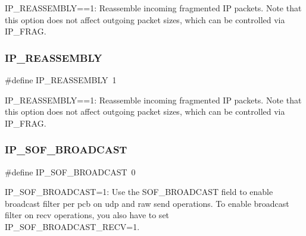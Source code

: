 I\+P\+\_\+\+R\+E\+A\+S\+S\+E\+M\+B\+LY==1\+: Reassemble incoming fragmented IP packets. Note that this option does not affect outgoing packet sizes, which can be controlled via I\+P\+\_\+\+F\+R\+AG. \mbox{\label{group__lwip__opts__ipv4_ga1a31ab0e0f37b17d40fa7c35bc2c4f69}} 
\subsubsection{\texorpdfstring{I\+P\+\_\+\+R\+E\+A\+S\+S\+E\+M\+B\+LY}{IP\_REASSEMBLY}\hspace{0.1cm}{\footnotesize\ttfamily [2/2]}}
{\footnotesize\ttfamily \#define I\+P\+\_\+\+R\+E\+A\+S\+S\+E\+M\+B\+LY~1}

I\+P\+\_\+\+R\+E\+A\+S\+S\+E\+M\+B\+LY==1\+: Reassemble incoming fragmented IP packets. Note that this option does not affect outgoing packet sizes, which can be controlled via I\+P\+\_\+\+F\+R\+AG. \mbox{\label{group__lwip__opts__ipv4_ga0b2c993fd940f5774108298933310384}} 
\subsubsection{\texorpdfstring{I\+P\+\_\+\+S\+O\+F\+\_\+\+B\+R\+O\+A\+D\+C\+A\+ST}{IP\_SOF\_BROADCAST}\hspace{0.1cm}{\footnotesize\ttfamily [1/2]}}
{\footnotesize\ttfamily \#define I\+P\+\_\+\+S\+O\+F\+\_\+\+B\+R\+O\+A\+D\+C\+A\+ST~0}

I\+P\+\_\+\+S\+O\+F\+\_\+\+B\+R\+O\+A\+D\+C\+A\+ST=1\+: Use the S\+O\+F\+\_\+\+B\+R\+O\+A\+D\+C\+A\+ST field to enable broadcast filter per pcb on udp and raw send operations. To enable broadcast filter on recv operations, you also have to set I\+P\+\_\+\+S\+O\+F\+\_\+\+B\+R\+O\+A\+D\+C\+A\+S\+T\+\_\+\+R\+E\+CV=1. \mbox{\label{group__lwip__opts__ipv4_ga0b2c993fd940f5774108298933310384}} 
